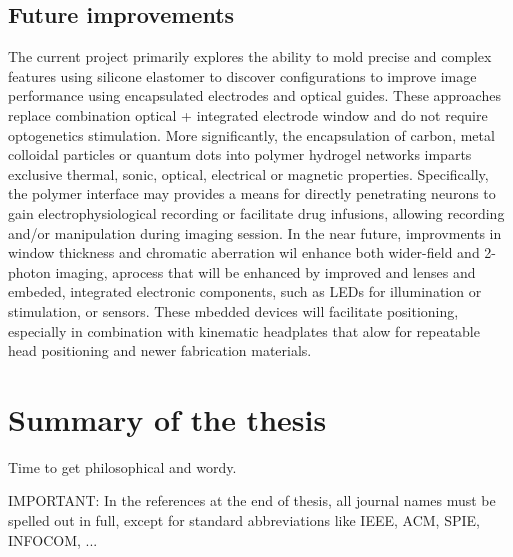 \subsection{Future improvements}
The current project primarily explores the ability to mold precise and complex features using silicone elastomer to discover configurations to improve image performance using encapsulated electrodes and optical guides. These approaches replace combination optical + integrated electrode window and do not require optogenetics stimulation. More significantly, the encapsulation of carbon, metal colloidal particles or quantum dots into polymer hydrogel networks imparts exclusive thermal, sonic, optical, electrical or magnetic properties. Specifically, the polymer interface may provides a means for directly penetrating neurons to gain electrophysiological recording or facilitate drug infusions, allowing recording and/or manipulation during imaging session. In the near future, improvments in window thickness and chromatic aberration wil enhance both wider-field and 2-photon imaging, aprocess that will be enhanced by improved and lenses and embeded, integrated electronic components, such as LEDs for illumination or stimulation, or sensors.  These mbedded devices will facilitate positioning, especially in combination with kinematic headplates that alow for repeatable head positioning and newer fabrication materials.



\clearpage


\graphicspath{{3_Conclusion/Figures/}}

\section{Summary of the thesis}

Time to get philosophical and wordy.

IMPORTANT: In the references at the end of thesis, all journal names must be
spelled out in full, except for standard abbreviations like IEEE, ACM, SPIE,
INFOCOM, ...